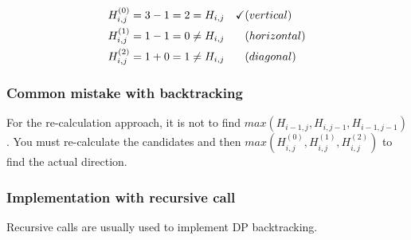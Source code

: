 \begin{align*}
H_{i,j}^{(0)} &= 3 - 1 = 2 = H_{i,j} &\checkmark & (vertical) \\
H_{i,j}^{(1)} &= 1 - 1 = 0 \neq H_{i,j} &\hfill & (horizontal) \\
H_{i,j}^{(2)} &= 1 + 0 = 1 \neq H_{i,j} &\hfill  & (diagonal)
\end{align*}

%
%
\subsubsection*{Common mistake with backtracking}
For the re-calculation approach, it is not to find $max(H_{i-1,j}, H_{i,j-1}, H_{i-1,j-1})$. You must re-calculate the candidates and then $max(H_{i,j}^{(0)}, H_{i,j}^{(1)} , H_{i,j}^{(2)})$ to find the actual direction.

%
%
\subsubsection*{Implementation with recursive call}
Recursive calls are usually used to implement DP backtracking.


